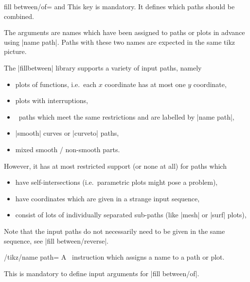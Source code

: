 \begin{pgfplotskey}{fill between/of= and }
	This key is mandatory. It defines which paths should be combined.

	The arguments are names which have been assigned to paths or plots in advance using |name path|. Paths with these two names are expected in the same tikz picture.

	The |fillbetween| library supports a variety of input paths, namely
	\begin{itemize}
		\item plots of functions, i.e.\ each $x$ coordinate has at most one $y$ coordinate,
		\item plots with interruptions,
		\item \Tikz\ paths which meet the same restrictions and are labelled by |name path|,
		\item |smooth| curves or |curveto| paths,
		\item mixed smooth / non-smooth parts.
	\end{itemize}
	However, it has at most restricted support (or none at all) for paths which
	\begin{itemize}
		\item have self-intersections (i.e.\ parametric plots might pose a problem),
		\item have coordinates which are given in a strange input sequence,
		\item consist of lots of individually separated sub-paths (like |mesh| or |surf| plots),
	\end{itemize}

	Note that the input paths do not necessarily need to be given in the same sequence, see |fill between/reverse|.
\end{pgfplotskey}

\begin{key}{/tikz/name path=}
	A \Tikz\ instruction which assigns a name to a path or plot.

	This is mandatory to define input arguments for |fill between/of|.
\end{key}

